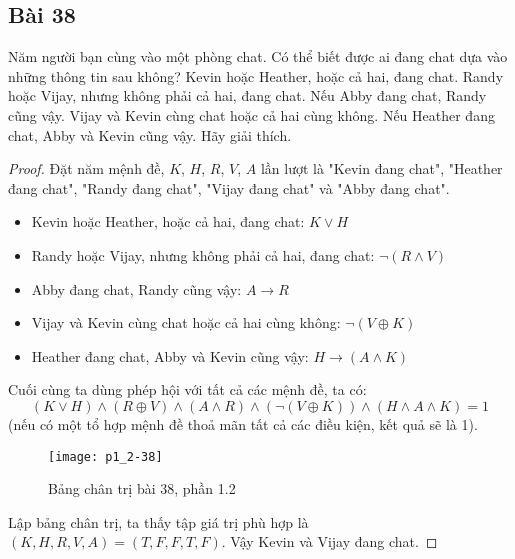 \subsection*{Bài 38}
Năm người bạn cùng vào một phòng chat. Có thể biết được ai đang chat dựa vào những thông tin sau không? Kevin hoặc Heather, hoặc cả hai, đang chat. Randy hoặc Vijay, nhưng không phải cả hai, đang chat. Nếu Abby đang chat, Randy cũng vậy. Vijay và Kevin cùng chat hoặc cả hai cùng không. Nếu Heather đang chat, Abby và Kevin cũng vậy. Hãy giải thích.
\begin{proof}
    Đặt năm mệnh đề, $K$, $H$, $R$, $V$, $A$ lần lượt là "Kevin đang chat", "Heather đang chat", "Randy đang chat", "Vijay đang chat" và "Abby đang chat". \begin{itemize}
        \item Kevin hoặc Heather, hoặc cả hai, đang chat: $K\lor H$
        \item Randy hoặc Vijay, nhưng không phải cả hai, đang chat: $\neg(R\land V)$
        \item Abby đang chat, Randy cũng vậy: $A\rightarrow R$
        \item Vijay và Kevin cùng chat hoặc cả hai cùng không: $\neg(V\oplus K)$
        \item Heather đang chat, Abby và Kevin cũng vậy: $H\rightarrow (A\land K)$
    \end{itemize}
    Cuối cùng ta dùng phép hội với tất cả các mệnh đề, ta có: $$(K\lor H)\land(R\oplus V)\land(A\land R)\land(\neg(V\oplus K))\land(H\land A\land K)=1$$ (nếu có một tổ hợp mệnh đề thoả mãn tất cả các điều kiện, kết quả sẽ là 1).\\
    \begin{figure}
        \caption{Bảng chân trị bài 38, phần 1.2}
        \texttt{[image: p1\_2-38]}
    \end{figure}
    \par Lập bảng chân trị, ta thấy tập giá trị phù hợp là $(K,H,R,V,A)=(T,F,F,T,F)$. Vậy Kevin và Vijay đang chat.
\end{proof}
